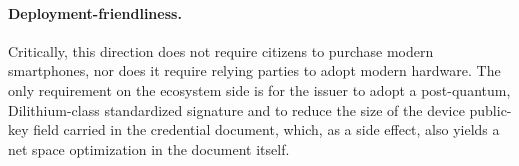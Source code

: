 \documentclass[binding=0.6cm,oneside,noexaminfo]{sapthesis}
\begin{document}
\paragraph{Deployment-friendliness.} Critically, this direction does not require citizens to purchase modern smartphones, nor does it require relying parties to adopt modern hardware. The only requirement on the ecosystem side is for the issuer to adopt a post-quantum, Dilithium-class standardized signature and to reduce the size of the device public-key field carried in the credential document, which, as a side effect, also yields a net space optimization in the document itself.

\backmatter



\end{document}
